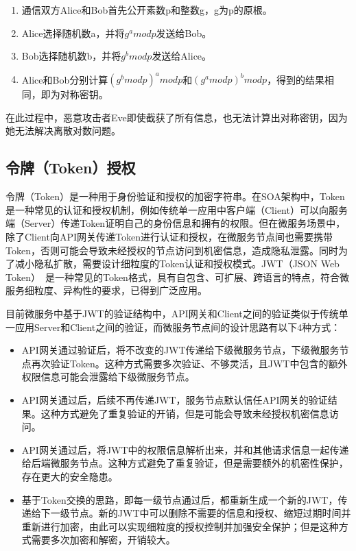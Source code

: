 \begin{enumerate}
    \item 通信双方Alice和Bob首先公开素数p和整数g，g为p的原根。
    \item Alice选择随机数a，并将$g^a mod p$发送给Bob。
    \item Bob选择随机数b，并将$g^b mod p$发送给Alice。
    \item Alice和Bob分别计算$(g^b mod p)^a mod p$和$(g^a mod p)^b mod p$，得到的结果相同，即为对称密钥。
\end{enumerate}

在此过程中，恶意攻击者Eve即使截获了所有信息，也无法计算出对称密钥，因为她无法解决离散对数问题。

\subsection{令牌（Token）授权}\label{subsec:token}

令牌（Token）是一种用于身份验证和授权的加密字符串。在SOA架构中，Token是一种常见的认证和授权机制，例如传统单一应用中客户端（Client）可以向服务端（Server）传递Token证明自己的身份信息和拥有的权限。但在微服务场景中，除了Client向API网关传递Token进行认证和授权，在微服务节点间也需要携带Token，否则可能会导致未经授权的节点访问到机密信息，造成隐私泄露。同时为了减小隐私扩散，需要设计细粒度的Token认证和授权模式。JWT（JSON Web Token）~\cite{rfc7519}是一种常见的Token格式，具有自包含、可扩展、跨语言的特点，符合微服务细粒度、异构性的要求，已得到广泛应用。

目前微服务中基于JWT的验证结构中，API网关和Client之间的验证类似于传统单一应用Server和Client之间的验证，而微服务节点间的设计思路有以下4种方式：

\begin{itemize}
    \item API网关通过验证后，将不改变的JWT传递给下级微服务节点，下级微服务节点再次验证Token。这种方式需要多次验证、不够灵活，且JWT中包含的额外权限信息可能会泄露给下级微服务节点。
    \item API网关通过后，后续不再传递JWT，服务节点默认信任API网关的验证结果。这种方式避免了重复验证的开销，但是可能会导致未经授权机密信息访问。
    \item API网关通过后，将JWT中的权限信息解析出来，并和其他请求信息一起传递给后端微服务节点。这种方式避免了重复验证，但是需要额外的机密性保护，存在更大的安全隐患。
    \item 基于Token交换的思路，即每一级节点通过后，都重新生成一个新的JWT，传递给下一级节点。新的JWT中可以删除不需要的信息和授权、缩短过期时间并重新进行加密，由此可以实现细粒度的授权控制并加强安全保护；但是这种方式需要多次加密和解密，开销较大。
\end{itemize}

